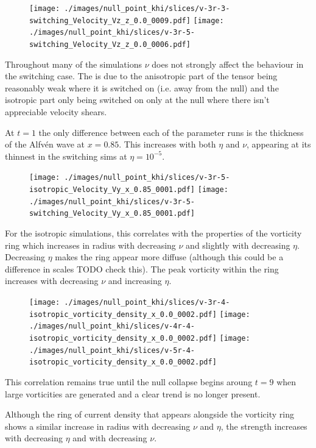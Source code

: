 \begin{figure}[H]
  \centering
  \texttt{[image: ./images/null\_point\_khi/slices/v-3r-3-switching\_Velocity\_Vz\_z\_0.0\_0009.pdf]}
  \texttt{[image: ./images/null\_point\_khi/slices/v-3r-5-switching\_Velocity\_Vz\_z\_0.0\_0006.pdf]}
\end{figure}

Throughout many of the simulations $\nu$ does not strongly affect the behaviour in the switching case. The is due to the anisotropic part of the tensor being reasonably weak where it is switched on (i.e. away from the null) and the isotropic part only being switched on only at the null where there isn't appreciable velocity shears.

At $t=1$ the only difference between each of the parameter runs is the thickness of the Alfv\'en wave at $x=0.85$. This increases with both $\eta$ and $\nu$, appearing at its thinnest in the switching sims at $\eta=10^{-5}$.

\begin{figure}[H]
  \centering
  \texttt{[image: ./images/null\_point\_khi/slices/v-3r-5-isotropic\_Velocity\_Vy\_x\_0.85\_0001.pdf]}
  \texttt{[image: ./images/null\_point\_khi/slices/v-3r-5-switching\_Velocity\_Vy\_x\_0.85\_0001.pdf]}
\end{figure}

For the isotropic simulations, this correlates with the properties of the vorticity ring which increases in radius with decreasing $\nu$ and slightly with decreasing $\eta$. Decreasing $\eta$ makes the ring appear more diffuse (although this could be a difference in scales TODO check this). The peak vorticity within the ring increases with decreasing $\nu$ and increasing $\eta$.

\begin{figure}[H]
  \centering
  \texttt{[image: ./images/null\_point\_khi/slices/v-3r-4-isotropic\_vorticity\_density\_x\_0.0\_0002.pdf]}
  \texttt{[image: ./images/null\_point\_khi/slices/v-4r-4-isotropic\_vorticity\_density\_x\_0.0\_0002.pdf]}
  \texttt{[image: ./images/null\_point\_khi/slices/v-5r-4-isotropic\_vorticity\_density\_x\_0.0\_0002.pdf]}
\end{figure}

This correlation remains true until the null collapse begins aroung $t=9$ when large vorticities are generated and a clear trend is no longer present.

Although the ring of current density that appears alongside the vorticity ring shows a similar increase in radius with decreasing $\nu$ and $\eta$, the strength increases with decreasing $\eta$ and with decreasing $\nu$.

